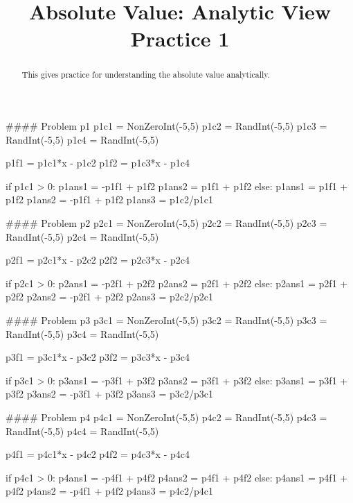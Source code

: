 \documentclass{ximera}
\title{Absolute Value: Analytic View Practice 1}
\begin{document}
\begin{abstract}
    This gives practice for understanding the absolute value analytically.
\end{abstract}
\maketitle


\begin{sagesilent}
#### Problem p1
p1c1 = NonZeroInt(-5,5)
p1c2 = RandInt(-5,5)
p1c3 = RandInt(-5,5)
p1c4 = RandInt(-5,5)

p1f1 = p1c1*x - p1c2
p1f2 = p1c3*x - p1c4

if p1c1 > 0:
    p1ans1 = -p1f1 + p1f2
    p1ans2 = p1f1 + p1f2
else:
    p1ans1 = p1f1 + p1f2
    p1ans2 = -p1f1 + p1f2
p1ans3 = p1c2/p1c1


#### Problem p2
p2c1 = NonZeroInt(-5,5)
p2c2 = RandInt(-5,5)
p2c3 = RandInt(-5,5)
p2c4 = RandInt(-5,5)

p2f1 = p2c1*x - p2c2
p2f2 = p2c3*x - p2c4

if p2c1 > 0:
    p2ans1 = -p2f1 + p2f2
    p2ans2 = p2f1 + p2f2
else:
    p2ans1 = p2f1 + p2f2
    p2ans2 = -p2f1 + p2f2
p2ans3 = p2c2/p2c1


#### Problem p3
p3c1 = NonZeroInt(-5,5)
p3c2 = RandInt(-5,5)
p3c3 = RandInt(-5,5)
p3c4 = RandInt(-5,5)

p3f1 = p3c1*x - p3c2
p3f2 = p3c3*x - p3c4

if p3c1 > 0:
    p3ans1 = -p3f1 + p3f2
    p3ans2 = p3f1 + p3f2
else:
    p3ans1 = p3f1 + p3f2
    p3ans2 = -p3f1 + p3f2
p3ans3 = p3c2/p3c1


#### Problem p4
p4c1 = NonZeroInt(-5,5)
p4c2 = RandInt(-5,5)
p4c3 = RandInt(-5,5)
p4c4 = RandInt(-5,5)

p4f1 = p4c1*x - p4c2
p4f2 = p4c3*x - p4c4

if p4c1 > 0:
    p4ans1 = -p4f1 + p4f2
    p4ans2 = p4f1 + p4f2
else:
    p4ans1 = p4f1 + p4f2
    p4ans2 = -p4f1 + p4f2
p4ans3 = p4c2/p4c1


\end{sagesilent}
\end{document}
